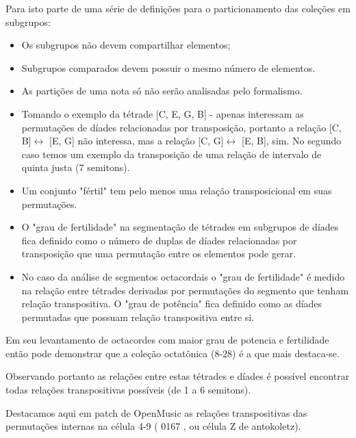 \documentclass[
	12pt,				%
	openright,			%
	twoside,			%
	a4paper,			%
	english,			%
	french,				%
	spanish,			%
	brazil				%
	]{abntex2}
\begin{document}
Para isto parte de uma série de definições para o particionamento das coleções em subgrupos:

\begin{itemize}
\item Os subgrupos não devem compartilhar elementos;
\item Subgrupos comparados devem possuir o mesmo número de elementos. 
\item As partições de uma nota só não serão analisadas pelo formalismo.
\item Tomando o exemplo da tétrade [C, E, G, B] - apenas interessam as permutações de díades relacionadas por transposição, portanto a relação [C, B]$\leftrightarrow $ [E, G] não interessa, mas a relação [C, G]$\leftrightarrow $ [E, B], sim. No segundo caso temos um exemplo da transposição de uma relação de intervalo de quinta justa (7 semitons).
\item Um conjunto "fértil" tem pelo menos uma relação transposicional em suas permutações.
\item O "grau de fertilidade" na segmentação de tétrades em subgrupos de díades fica definido como o número de duplas de díades relacionadas por transposição que uma permutação entre os elementos pode gerar.
\item No caso da análise de segmentos octacordais o "grau de fertilidade" é medido na relação entre tétrades derivadas por permutações do segmento que tenham relação transpositiva. O "grau de potência" fica definido como as díades permutadas que possuam relação transpositiva entre si.

\end{itemize}


Em seu levantamento de octacordes com maior grau de potencia e fertilidade \cite{cohn1991bartok} então pode demonstrar que a coleção octatônica (8-28) é a que mais destaca-se.


Observando portanto as relações entre estas tétrades e díades é possível encontrar todas relações transpositivas possíveis (de 1 a 6 semitons).


Destacamos aqui em patch de OpenMusic as relações transpositivas das permutações internas na célula 4-9 ( 0167 , ou célula Z de antokoletz).
\end{document}

